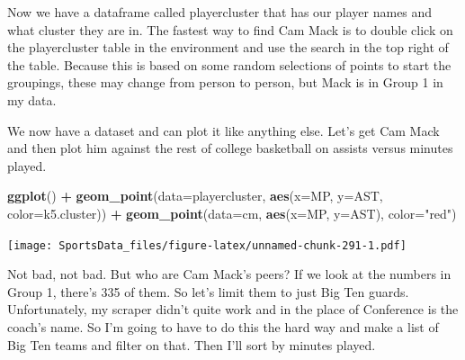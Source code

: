 \documentclass[]{book}
\newenvironment{Shaded}{\begin{snugshade}}{\end{snugshade}}
\newcommand{\DataTypeTok}[1]{\textcolor[rgb]{0.13,0.29,0.53}{#1}}
\newcommand{\KeywordTok}[1]{\textcolor[rgb]{0.13,0.29,0.53}{\textbf{#1}}}
\newcommand{\NormalTok}[1]{#1}
\newcommand{\OperatorTok}[1]{\textcolor[rgb]{0.81,0.36,0.00}{\textbf{#1}}}
\newcommand{\StringTok}[1]{\textcolor[rgb]{0.31,0.60,0.02}{#1}}
\begin{document}
\begin{Shaded}
\end{Shaded}

Now we have a dataframe called playercluster that has our player names and what cluster they are in. The fastest way to find Cam Mack is to double click on the playercluster table in the environment and use the search in the top right of the table. Because this is based on some random selections of points to start the groupings, these may change from person to person, but Mack is in Group 1 in my data.

We now have a dataset and can plot it like anything else. Let's get Cam Mack and then plot him against the rest of college basketball on assists versus minutes played.

\begin{Shaded}
\end{Shaded}

\begin{Shaded}
\begin{Highlighting}[]
\KeywordTok{ggplot}\NormalTok{() }\OperatorTok{+}\StringTok{ }
\StringTok{  }\KeywordTok{geom_point}\NormalTok{(}\DataTypeTok{data=}\NormalTok{playercluster, }\KeywordTok{aes}\NormalTok{(}\DataTypeTok{x=}\NormalTok{MP, }\DataTypeTok{y=}\NormalTok{AST, }\DataTypeTok{color=}\NormalTok{k5.cluster)) }\OperatorTok{+}\StringTok{ }
\StringTok{  }\KeywordTok{geom_point}\NormalTok{(}\DataTypeTok{data=}\NormalTok{cm, }\KeywordTok{aes}\NormalTok{(}\DataTypeTok{x=}\NormalTok{MP, }\DataTypeTok{y=}\NormalTok{AST), }\DataTypeTok{color=}\StringTok{"red"}\NormalTok{)}
\end{Highlighting}
\end{Shaded}

\texttt{[image: SportsData\_files/figure-latex/unnamed-chunk-291-1.pdf]}

Not bad, not bad. But who are Cam Mack's peers? If we look at the numbers in Group 1, there's 335 of them. So let's limit them to just Big Ten guards. Unfortunately, my scraper didn't quite work and in the place of Conference is the coach's name. So I'm going to have to do this the hard way and make a list of Big Ten teams and filter on that. Then I'll sort by minutes played.
\end{document}
